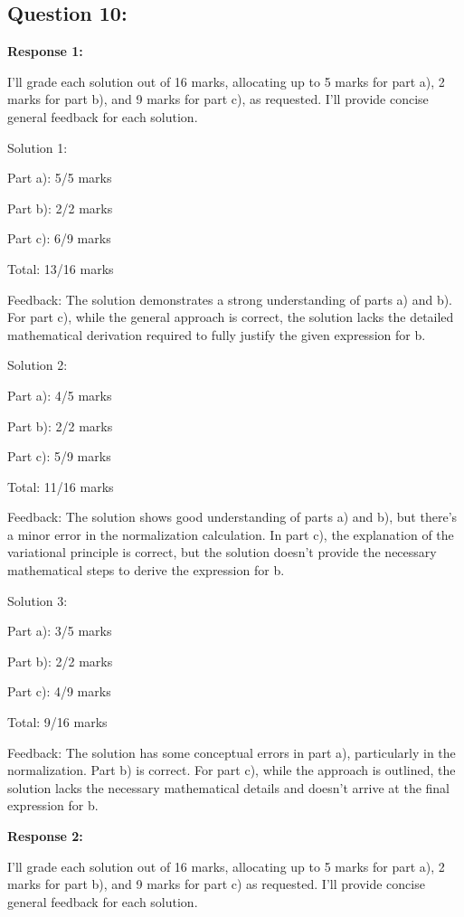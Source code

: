 \documentclass[a4paper,11pt]{article}
\begin{document}
\subsection*{Question 10:}

\textbf{Response 1:}

I'll grade each solution out of 16 marks, allocating up to 5 marks for part a), 2 marks for part b), and 9 marks for part c), as requested. I'll provide concise general feedback for each solution.

Solution 1:

Part a): 5/5 marks

Part b): 2/2 marks

Part c): 6/9 marks

Total: 13/16 marks

Feedback: The solution demonstrates a strong understanding of parts a) and b). For part c), while the general approach is correct, the solution lacks the detailed mathematical derivation required to fully justify the given expression for b.

Solution 2:

Part a): 4/5 marks

Part b): 2/2 marks

Part c): 5/9 marks

Total: 11/16 marks

Feedback: The solution shows good understanding of parts a) and b), but there's a minor error in the normalization calculation. In part c), the explanation of the variational principle is correct, but the solution doesn't provide the necessary mathematical steps to derive the expression for b.

Solution 3:

Part a): 3/5 marks

Part b): 2/2 marks

Part c): 4/9 marks

Total: 9/16 marks

Feedback: The solution has some conceptual errors in part a), particularly in the normalization. Part b) is correct. For part c), while the approach is outlined, the solution lacks the necessary mathematical details and doesn't arrive at the final expression for b.

\bigskip   
\textbf{Response 2:}

I'll grade each solution out of 16 marks, allocating up to 5 marks for part a), 2 marks for part b), and 9 marks for part c) as requested. I'll provide concise general feedback for each solution.
\end{document}
